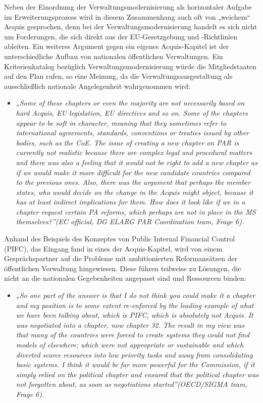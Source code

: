 Neben der Einordnung der Verwaltungsmodernisierung als horizontaler Aufgabe im Erweiterungsprozess wird in diesem Zusammenhang auch oft von „weichem“ Acquis gesprochen, denn bei der Verwaltungsmodernisierung handelt es sich nicht um Forderungen, die sich direkt aus der EU-Gesetzgebung und -Richtlinien ableiten. 
Ein weiteres Argument gegen ein eigenes Acquis-Kapitel ist der unterschiedliche Aufbau von nationalen öffentlichen Verwaltungen. Ein Kriterienkatalog bezüglich Verwaltungsmodernisierung würde die Mitgliedstaaten auf den Plan rufen, so eine Meinung, da die Verwaltungsausgestaltung als ausschließlich nationale Angelegenheit wahrgenommen wird:
\begin{itemize}[label={}]
\item \textit{„Some of these chapters or even the majority are not necessarily based on hard Acquis, EU legislation, EU directives and so on. Some of the chapters appear to be soft in character, meaning that they sometimes refer to international agreements, standards, conventions or treaties issued by other bodies, such as the CoE. The issue of creating a new chapter on PAR is currently not realistic because there are complex legal and procedural matters and there was also a feeling that it would not be right to add a new chapter as if we would make it more difficult for the new candidate countries compared to the previous ones. Also, there was the argument that perhaps the member states, who would decide on the change in the Acquis might object, because it has at least indirect implications for them. How does it look like if we in a chapter request certain PA reforms, which perhaps are not in place in the MS themselves?”(EC official, DG ELARG PAR Coordination team, Frage 6).}
\end{itemize}

Anhand des Beispiels des Konzeptes von Public Internal Financial Control (PIFC), das Eingang fand in eines der Acquis-Kapitel, wird von einem Gesprächspartner auf die Probleme mit ambitionierten Reformansätzen der öffentlichen Verwaltung hingewiesen. Diese führen teilweise zu Lösungen, die nicht an die nationalen Gegebenheiten angepasst sind und Ressourcen binden:
\begin{itemize}[label={}]
\item \textit{„So one part of the answer is that I do not think you could make it a chapter and my position is to some extent re-enforced by the leading example of what we have been talking about, which is PIFC, which is absolutely not Acquis. It was negotiated into a chapter, now chapter 32. The result in my view was that many of the countries were forced to create systems they could not find models of elsewhere; which were not appropriate or sustainable and which diverted scarce resources into low priority tasks and away from consolidating basic systems. I think it would be far more powerful for the Commission, if it simply relied on the political chapter and ensured that the political chapter was not forgotten about, as soon as negotiations started”(OECD/SIGMA team, Frage 6).}
\end{itemize}

